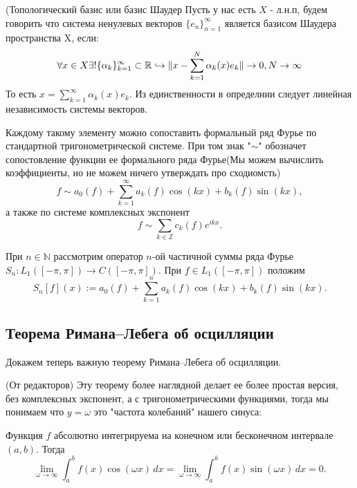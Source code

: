 \begin{definition}
    (Топологический базис или базис Шаудер    Пусть у нас есть $X$ - л.н.п, будем говорить что система ненулевых векторов $\{e_n\}_{n=1}^{\infty}$ является базисом Шаудера пространства X, если:
    \[
    \forall x \in X \exists! \{\alpha_k\}_{k=1}^{\infty} \subset \mathbb{R} \hookrightarrow \| x - \sum_{k=1}^{N} \alpha_k(x) e_k\| \to 0, N \to \infty
    \]
    То есть $x = \sum\limits_{k=1}^{\infty} \alpha_k(x) e_k$. Из единственности в определнии следует линейная независимость системы векторов.
\end{definition}

\begin{proposition}
    Каждому такому элементу можно сопоставить формальный ряд Фурье по стандартной тригонометрической системе. При том знак "$\sim$" обозначет сопостовление функции ее формального ряда Фурье(Мы можем вычислить коэффициенты, но не можем ничего утверждать про сходиомсть)
$$
f \sim a_{0}(f)+\sum\limits_{k=1}^{\infty}a_{k}(f)\cos(kx) + b_{k}(f)\sin(kx),
$$
а также по системе комплексных экспонент
$$
f \sim \sum\limits_{k \in \mathbb{Z}}c_{k}(f)e^{ikx}.
$$

При $n \in \mathbb{N}$ рассмотрим оператор $n$-ой частичной суммы ряда Фурье $S_{n}:L_{1}([-\pi,\pi]) \to C([-\pi,\pi])$. При $f \in L_{1}([-\pi,\pi])$ положим
$$
S_{n}[f](x):=a_{0}(f)+\sum\limits_{k=1}^{n}a_{k}(f)\cos(kx) + b_{k}(f)\sin(kx).
$$
\end{proposition}



\subsection{Теорема Римана--Лебега об осцилляции}

Докажем теперь важную теорему Римана--Лебега об осцилляции.
\begin{note}
    (От редакторов) Эту теорему более наглядной делает ее более простая версия, без комплексных экспонент, а с тригонометрическими функциями, тогда мы понимаем что $y=\omega$ это "частота колебаний" нашего синуса:

Функция \( f \) абсолютно интегрируема на конечном или бесконечном интервале \( (a, b) \). Тогда
\[
\lim_{\omega \to \infty} \int_a^b f(x) \cos(\omega x)\,dx = \lim_{\omega \to \infty} \int_a^b f(x) \sin(\omega x)\,dx = 0.
\]
\end{note}
    
